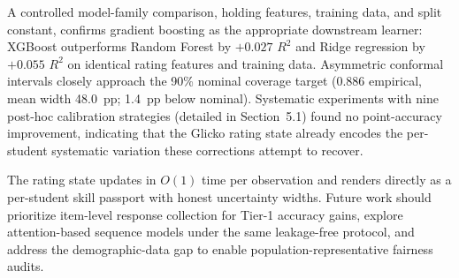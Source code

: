 \documentclass[11pt]{article}
\begin{document}
A controlled model-family comparison, holding features, training data, and split
constant, confirms gradient boosting as the appropriate downstream learner:
XGBoost outperforms Random Forest by $+0.027$ $R^{2}$ and Ridge regression by
$+0.055$ $R^{2}$ on identical rating features and training data.
Asymmetric conformal intervals closely approach the 90\% nominal coverage target
(0.886 empirical, mean width 48.0~pp; 1.4~pp below nominal).
Systematic experiments with nine post-hoc calibration strategies (detailed in Section~5.1)
found no point-accuracy improvement, indicating that the Glicko rating state already encodes
the per-student systematic variation these corrections attempt to recover.

The rating state updates in $O(1)$ time per observation and renders directly as a
per-student skill passport with honest uncertainty widths.
Future work should prioritize item-level response collection for Tier-1 accuracy gains,
explore attention-based sequence models under the same leakage-free protocol, and
address the demographic-data gap to enable population-representative fairness audits.
\end{document}
